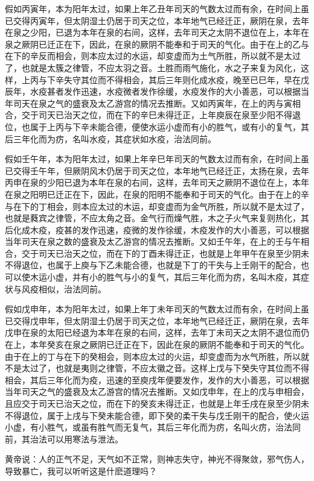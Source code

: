 \documentclass[12pt,UTF8]{ctexbook}
\begin{document}
假如丙寅年，本为阳年太过，如果上年乙丑年司天的气数太过而有余，在时间上虽已交得丙寅年，但太阴湿土仍居于司天之位，本年地气已经迁正，厥阴在泉，去年在泉之少阳，已退为本年在泉的右间，这样，去年司天之太阴不退位在上，本年在泉之厥阴已迁正在下，因此，在泉的厥阴不能奉和于司天的气化。由于在上的乙与在下的辛反而相会，则本应太过的水运，却变虚而为土气所胜，所以就不是太过了，也就是太簇之律管，不应太羽之音。土胜而雨气施化，水之子来复为风化，这样，上丙与下辛失守其位而不得相会，其后三年则化成水疫，晚至已巳年，早在戊辰年，水疫甚者发作迅速，水疫微者发作徐缓，水疫发作的大小善恶，可以根据当年司天在泉之气的盛衰及太乙游宫的情况去推断。又如丙寅年，在上的丙与寅相合，交于司天已治天之位，而在下的辛巳未得迁正，上年庾辰在泉至少阳不得退位，也属于上丙与下辛未能合德，便使水运小虚而有小的胜气，或有小的复气，其后三年化而为疠，名叫水疫，其症状如水疫，治法同前。

假如壬午年，本为阳年太过，如果上年辛巳年司天的气数太过而有余，在时间上虽已交得壬午年，但厥阴风木仍居于司天之位，本年地气已经迁正，太扬在泉，去年丙申在泉的少阳已退为本年在泉的右间，这样，去年司天之厥阴不退位在上，本年在泉之阳明已迁正在下，因此，在泉的阳明不能奉和于司天的气化。由于在上的辛与在下的丁相会，则本应太过的木运，却变虚而为金气所胜，所以就不是太过了，也就是蕤宾之律管，不应太角之音。金气行而燥气胜，木之子火气来复则热化，其后化成木疫，疫甚的发作迅速，疫微的发作徐缓，木疫发作的大小善恶，可以根据当年司天在泉之数的盛衰及太乙游宫的情况去推断。又如壬午年，在上的壬与午相合，交于司天已治天之位，而在下的丁酉未得迁正，也就是上年甲午在泉至少阴未不得退位，也属于上庾与下乙未能合德，也就是下丁的干失与上壬刚干的配合，也可以使木运小虚，并有小的胜气与小的复气，其后三年化而为疠，名叫木疫，其症状与风疫相似，治法同前。

假如戊申年，本为阳年太过，如果上年丁未年司天的气数太过而有余，在时间上虽已交得戊申年，但太阴湿土仍居于司天之位，本年地气已经迁正，厥阴在泉，去年戊申在泉的太阳已经退为本年在泉的右间，这样，去年丁未司天之太阴不退位而仍在上，本年癸亥在泉之厥阴已迁正在下，因此在泉的厥阴不能奉和于司天的气化。由于在上的丁与在下的癸相会，则本应太过的火运，却变虚而为水气所胜，所以就不是太过了，也就是夷则之律管，不应太徽之音。这样上戊与下癸失守其位而不得相会，其后三年化而为疫，迅速的至庾戌年便要发作，发作的大小善恶，可以根据当年司天之气的盛衰及太乙游宫的情况去推断。又如戊申年，在上的戊与申相会，且应交于司天已治天之位，而在下的癸亥未得迁正，也就是上年壬戌在泉至少阴未不得退位，属于上戌与下癸未能合德，即下癸的柔干失与戊壬刚干的配合，使火运小虚，有小胜气，或虽有胜气而无复气，其后三年化而为疠，名叫火疠，治法同前，其治法可以用寒法与泄法。

黄帝说：人的正气不足，天气如不正常，则神志失守，神光不得聚敛，邪气伤人，导致暴亡，我可以听听这是什麽道理吗？
\end{document}
